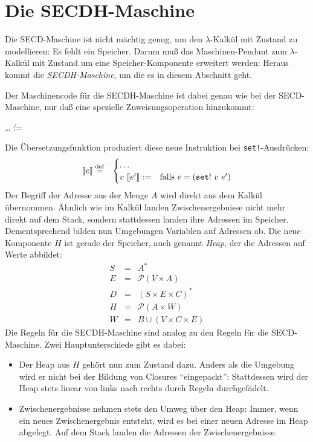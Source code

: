 \section{Die SECDH-Maschine}

Die SECD-Maschine ist nicht mächtig genug, um den $\lambda$-Kalkül mit
Zustand zu modellieren: Es fehlt ein Speicher.  Darum muß das
Maschinen-Pendant zum $\lambda$-Kalkül mit Zustand um eine
Speicher-Komponente erweitert werden: Heraus kommt die
\textit{SECDH-Maschine}, um die es in diesem Abschnitt geht.

Der Maschinencode für die SECDH-Maschine ist dabei genau wie bei der
SECD-Maschine, nur daß eine spezielle Zuweisungsoperation hinzukommt:
%
\begin{grammar}
   \: \ldots
  \> \| :=
\end{grammar}
%
Die Übersetzungsfunktion produziert diese neue Instruktion bei
\texttt{set!}-Ausdrücken:
%
\begin{eqnarray*}
  \llbracket e \rrbracket &\stackrel{\rm def}{=}&
  \begin{cases}
    \ldots\\
    v~\llbracket e'\rrbracket~\mathtt{:=}
    & \textrm{falls $e = (\mathtt{set!}~v~e')$}
  \end{cases}
\end{eqnarray*}  
%
Der Begriff der Adresse aus der Menge $A$ wird direkt aus dem Kalkül
übernommen.  Ähnlich wie im Kalkül landen Zwischenergebnisse nicht
mehr direkt auf dem Stack, sondern stattdessen landen ihre Adressen im
Speicher.  Dementsprechend bilden nun Umgebungen Variablen auf
Adressen ab.  Die neue Komponente $H$ ist gerade der Speicher, auch
genannt \textit{Heap}, der die Adressen auf Werte
abbildet:
%
\begin{eqnarray*}
  S &=& A^{\ast}\\
  E &=& \mathcal{P}(V\times A)\\
  D &=& (S\times E\times C)^{\ast}\\
  H &=& \mathcal{P}(A\times W)\\
  W &=& B \cup (V\times C\times E)
\end{eqnarray*}
%
Die Regeln für die SECDH-Maschine sind analog zu den Regeln für die
SECD-Maschine.  Zwei Hauptunterschiede gibt es dabei:
%
\begin{itemize}
\item Der Heap aus $H$ gehört nun zum Zustand dazu.  Anders als die
  Umgebung wird er nicht bei der Bildung von Closures "`eingepackt"':
  Stattdessen wird der Heap stets linear von links nach rechts durch
  Regeln durchgefädelt.
\item Zwischenergebnisse nehmen stets den Umweg über den Heap: Immer,
  wenn ein neues Zwischenergebnis entsteht, wird es bei einer neuen
  Adresse im Heap abgelegt. Auf dem Stack landen die
  Adressen der Zwischenergebnisse.
\end{itemize}

